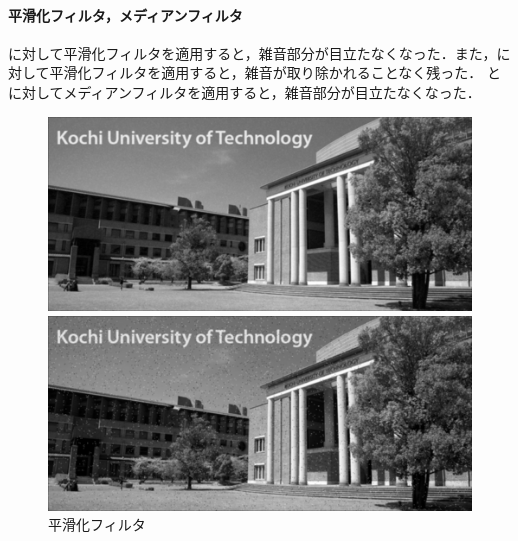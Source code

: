 \paragraph{平滑化フィルタ，メディアンフィルタ}
\wgnimg に対して平滑化フィルタを適用すると，雑音部分が目立たなくなった．また，\inimg に対して平滑化フィルタを適用すると，雑音が取り除かれることなく残った．
\wgnimg と\inimg に対してメディアンフィルタを適用すると，雑音部分が目立たなくなった．
\begin{figure}[H]
    \centering
    \begin{minipage}[b]{.49\textwidth}
        \begin{minipage}[b]{.49\textwidth}
            \includegraphics[keepaspectratio,width=\textwidth]{../../Figures/06_21_sf_img_wgn.png}
            \subcaption{\wgnimg}
        \end{minipage}
        \begin{minipage}[b]{.49\textwidth}
            \includegraphics[keepaspectratio,width=\textwidth]{../../Figures/06_22_sf_img_in.png}
            \subcaption{\inimg}
        \end{minipage}
        \caption{平滑化フィルタ}
    \end{minipage}
    \begin{minipage}[b]{.49\textwidth}
        \begin{minipage}[b]{.49\textwidth}

\end{minipage}
\end{minipage}
\end{figure}
